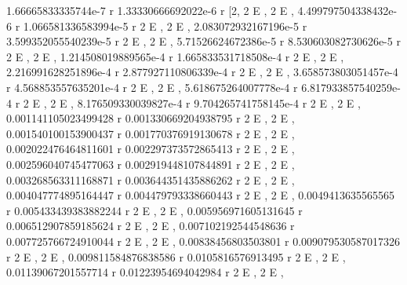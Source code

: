 \documentclass[a4paper,10pt]{article}
\begin{document}
\begin{eulernotebook}
\begin{eulercomment}
\begin{eulercomment}
\begin{eulercomment}
\begin{eulercomment}
\begin{eulercomment}
\begin{eulercomment}
\begin{eulercomment}
\begin{eulercomment}
\begin{eulercomment}
\begin{eulercomment}
\begin{eulercomment}
\begin{eulercomment}
\begin{eulercomment}
\begin{eulercomment}
\begin{eulercomment}
\begin{eulercomment}
\begin{eulercomment}
\begin{eulercomment}
\begin{eulercomment}
\begin{eulercomment}
\begin{eulercomment}
\begin{eulercomment}
\begin{eulercomment}
\begin{eulercomment}
\begin{euleroutput}
                 1.66665833335744e-7 r     1.33330666692022e-6 r
          [2, 2 E                     , 2 E                     , 
     4.499797504338432e-6 r     1.066581336583994e-5 r
  2 E                      , 2 E                      , 
     2.083072932167196e-5 r     3.599352055540239e-5 r
  2 E                      , 2 E                      , 
     5.71526624672386e-5 r     8.530603082730626e-5 r
  2 E                     , 2 E                      , 
     1.214508019889565e-4 r     1.665833531718508e-4 r
  2 E                      , 2 E                      , 
     2.216991628251896e-4 r     2.877927110806339e-4 r
  2 E                      , 2 E                      , 
     3.658573803051457e-4 r     4.568853557635201e-4 r
  2 E                      , 2 E                      , 
     5.618675264007778e-4 r     6.817933857540259e-4 r
  2 E                      , 2 E                      , 
     8.176509330039827e-4 r     9.704265741758145e-4 r
  2 E                      , 2 E                      , 
     0.001141105023499428 r     0.001330669204938795 r
  2 E                      , 2 E                      , 
     0.001540100153900437 r     0.001770376919130678 r
  2 E                      , 2 E                      , 
     0.002022476464811601 r     0.002297373572865413 r
  2 E                      , 2 E                      , 
     0.002596040745477063 r     0.002919448107844891 r
  2 E                      , 2 E                      , 
     0.003268563311168871 r     0.003644351435886262 r
  2 E                      , 2 E                      , 
     0.004047774895164447 r     0.004479793338660443 r
  2 E                      , 2 E                      , 
     0.0049413635565565 r     0.005433439383882244 r
  2 E                    , 2 E                      , 
     0.005956971605131645 r     0.006512907859185624 r
  2 E                      , 2 E                      , 
     0.007102192544548636 r     0.007725766724910044 r
  2 E                      , 2 E                      , 
     0.00838456803503801 r     0.009079530587017326 r
  2 E                     , 2 E                      , 
     0.009811584876838586 r     0.0105816576913495 r
  2 E                      , 2 E                    , 
     0.01139067201557714 r     0.01223954694042984 r
  2 E                     , 2 E                     , 

\end{euleroutput}
\end{eulercomment}
\end{eulercomment}
\end{eulercomment}
\end{eulercomment}
\end{eulercomment}
\end{eulercomment}
\end{eulercomment}
\end{eulercomment}
\end{eulercomment}
\end{eulercomment}
\end{eulercomment}
\end{eulercomment}
\end{eulercomment}
\end{eulercomment}
\end{eulercomment}
\end{eulercomment}
\end{eulercomment}
\end{eulercomment}
\end{eulercomment}
\end{eulercomment}
\end{eulercomment}
\end{eulercomment}
\end{eulercomment}
\end{eulercomment}
\end{eulernotebook}
\end{document}
